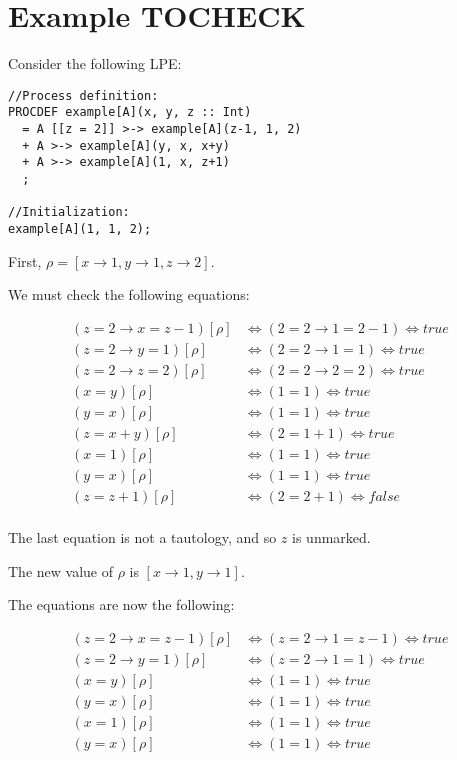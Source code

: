 \section{Example TOCHECK}

Consider the following LPE:

\begin{lstlisting}
//Process definition:
PROCDEF example[A](x, y, z :: Int)
  = A [[z = 2]] >-> example[A](z-1, 1, 2)
  + A >-> example[A](y, x, x+y)
  + A >-> example[A](1, x, z+1)
  ;

//Initialization:
example[A](1, 1, 2);
\end{lstlisting}

First, $\rho = [ x \rightarrow 1, y \rightarrow 1, z \rightarrow 2 ]$.

We must check the following equations:

\begin{align*}
(z = 2 \rightarrow x = z-1)[\rho] &\Leftrightarrow (2 = 2 \rightarrow 1 = 2-1) \Leftrightarrow \textit{true} \\
(z = 2 \rightarrow y = 1)[\rho] &\Leftrightarrow (2 = 2 \rightarrow 1 = 1) \Leftrightarrow \textit{true} \\
(z = 2 \rightarrow z = 2)[\rho] &\Leftrightarrow (2 = 2 \rightarrow 2 = 2) \Leftrightarrow \textit{true} \\
(x = y)[\rho] &\Leftrightarrow (1 = 1) \Leftrightarrow \textit{true} \\
(y = x)[\rho] &\Leftrightarrow (1 = 1) \Leftrightarrow \textit{true} \\
(z = x+y)[\rho] &\Leftrightarrow (2 = 1+1) \Leftrightarrow \textit{true} \\
(x = 1)[\rho] &\Leftrightarrow (1 = 1) \Leftrightarrow \textit{true} \\
(y = x)[\rho] &\Leftrightarrow (1 = 1) \Leftrightarrow \textit{true} \\
(z = z+1)[\rho] &\Leftrightarrow (2 = 2+1) \Leftrightarrow \textit{false} \\
\end{align*}

The last equation is not a tautology, and so $z$ is unmarked.

The new value of $\rho$ is $[ x \rightarrow 1, y \rightarrow 1 ]$.

\clearpage
The equations are now the following:

\begin{align*}
(z = 2 \rightarrow x = z-1)[\rho] &\Leftrightarrow (z = 2 \rightarrow 1 = z-1) \Leftrightarrow \textit{true} \\
(z = 2 \rightarrow y = 1)[\rho] &\Leftrightarrow (z = 2 \rightarrow 1 = 1) \Leftrightarrow \textit{true} \\
(x = y)[\rho] &\Leftrightarrow (1 = 1) \Leftrightarrow \textit{true} \\
(y = x)[\rho] &\Leftrightarrow (1 = 1) \Leftrightarrow \textit{true} \\
(x = 1)[\rho] &\Leftrightarrow (1 = 1) \Leftrightarrow \textit{true} \\
(y = x)[\rho] &\Leftrightarrow (1 = 1) \Leftrightarrow \textit{true} \\
\end{align*}

